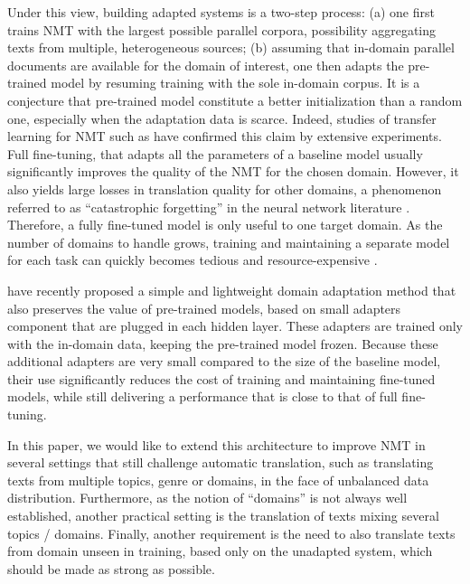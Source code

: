 \documentclass[11pt,a4paper]{article}
\newcommand{\fyDone}[1]{\done[FY]\Todo[FY:]{\textcolor{orange}{#1}}}
\begin{document}
Under this view, building adapted systems is a two-step process: (a) one first trains NMT with the largest possible parallel corpora, possibility aggregating texts from multiple, heterogeneous sources; (b) assuming that in-domain parallel documents are available for the domain of interest, one then adapts the pre-trained model by resuming training with the sole in-domain corpus. It is a conjecture that pre-trained model constitute a better initialization than a random one, especially when the adaptation data is scarce. Indeed, studies of transfer learning for NMT such as \cite{artetxe20cross,aji20neural} have confirmed this claim by extensive experiments. Full fine-tuning, that adapts all the parameters of a baseline model usually significantly improves the quality of the NMT for the chosen domain. However, it also yields large losses in translation quality for other domains, a phenomenon referred to as ``catastrophic forgetting'' in the neural network literature \cite{McCloskey89catastrophic}. Therefore, a fully fine-tuned model is only useful to one target domain. As the number of domains to handle grows, training and maintaining a separate model for each task can quickly becomes tedious and resource-expensive .\fyDone{Fix this sentence.}

\cite{Vilar18learning,Bapna19simple} have recently proposed a simple and lightweight domain adaptation method that also preserves the value of pre-trained models, based on small adapters component that are plugged in each hidden layer. These adapters are trained only with the in-domain data, keeping the pre-trained model frozen. Because these additional adapters are very small compared to the size of the baseline model, their use significantly reduces the cost of training and maintaining fine-tuned models, while still delivering a performance that is close to that of full fine-tuning.

In this paper, we would like to extend this architecture to improve NMT in several settings that still challenge automatic translation, such as translating texts from multiple topics, genre or domains, in the face of unbalanced data distribution. Furthermore, as the notion of ``domains''  is not always well established, another practical setting is the translation of texts mixing several topics / domains. Finally, another requirement is the need to also translate texts from domain unseen in training, based only on the unadapted system, which should be made as strong as possible. 
\fyDone{Say differently: various implementations}
\end{document}

